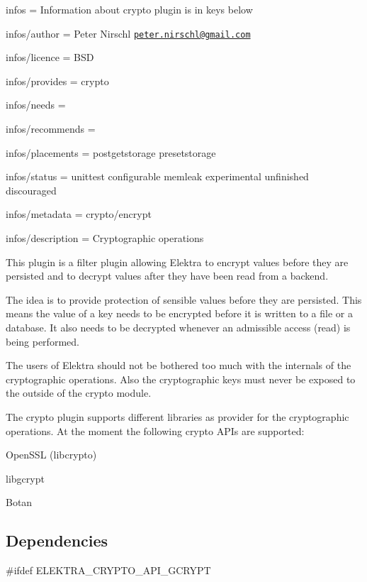 
\begin{DoxyItemize}
\item infos = Information about crypto plugin is in keys below
\item infos/author = Peter Nirschl \href{mailto:peter.nirschl@gmail.com}{\tt peter.\+nirschl@gmail.\+com}
\item infos/licence = B\+SD
\item infos/provides = crypto
\item infos/needs =
\item infos/recommends =
\item infos/placements = postgetstorage presetstorage
\item infos/status = unittest configurable memleak experimental unfinished discouraged
\item infos/metadata = crypto/encrypt
\item infos/description = Cryptographic operations
\end{DoxyItemize}

This plugin is a filter plugin allowing Elektra to encrypt values before they are persisted and to decrypt values after they have been read from a backend.

The idea is to provide protection of sensible values before they are persisted. This means the value of a key needs to be encrypted before it is written to a file or a database. It also needs to be decrypted whenever an admissible access (read) is being performed.

The users of Elektra should not be bothered too much with the internals of the cryptographic operations. Also the cryptographic keys must never be exposed to the outside of the crypto module.

The crypto plugin supports different libraries as provider for the cryptographic operations. At the moment the following crypto A\+P\+Is are supported\+:


\begin{DoxyItemize}
\item Open\+S\+SL ({\ttfamily libcrypto})
\item libgcrypt
\item Botan
\end{DoxyItemize}

\subsection*{Dependencies}

\#ifdef E\+L\+E\+K\+T\+R\+A\+\_\+\+C\+R\+Y\+P\+T\+O\+\_\+\+A\+P\+I\+\_\+\+G\+C\+R\+Y\+PT


